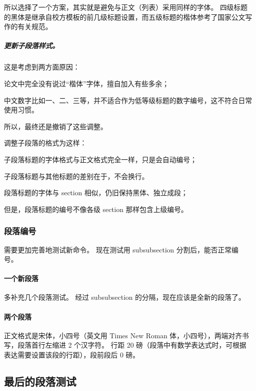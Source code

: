\documentclass[../Main/thesis]{subfiles}
\begin{document}
所以选择了一个方案，其实就是避免与正文（列表）采用同样的字体。
四级标题的黑体是继承自校方模板的前几级标题设置，而五级标题的楷体参考了国家公文写作的有关规范\cite{GBT9704}。

\subparagraph{更新子段落样式。}
这是考虑到两方面原因：
\begin{inlinecn}
  \item 论文中完全没有说过“楷体”字体，擅自加入有些多余；
  \item 中文数字比如一、二、三等，并不适合作为低等级标题的数字编号，这不符合日常使用习惯。
\end{inlinecn}
所以，最终还是撤销了这些调整。

调整子段落的格式为这样：
\begin{inline}
  \item 子段落标题的字体格式与正文格式完全一样，只是会自动编号；
  \item 子段落标题与其他标题的差别在于，不会换行。
  \item 段落标题的字体与 section 相似，仍旧保持黑体、独立成段；
  \item 但是，段落标题的编号不像各级 section 那样包含上级编号。
\end{inline}

\subsubsection{段落编号}

需要更加完善地测试新命令。
现在测试用 subsubsection 分割后，能否正常编号。

\paragraph{一个新段落}

多补充几个段落测试。
经过 subsubsection 的分隔，现在应该是全新的段落了。

\paragraph{两个段落} \label{par:second}

正文格式是宋体，小四号（英文用 Times New Roman 体，小四号），两端对齐书写，段落首行左缩进 2 个汉字符。
行距 20 磅（段落中有数学表达式时，可根据表达需要设置该段的行距），段前段后 0 磅。

\subsection{最后的段落测试} \label{ssc:lastpar}
\end{document}
